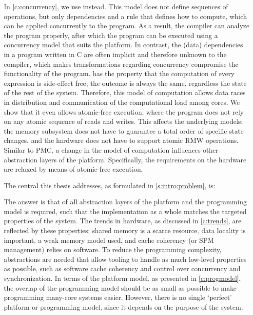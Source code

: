 In \cref{c:concurrency}, we use \lcalc instead.
This model does not define sequences of operations, but only dependencies and a rule that defines how to compute, which can be applied concurrently to the program.
As a result, the compiler can analyze the program properly, after which the program can be executed using a concurrency model that suits the platform.
In contrast, the (data) dependencies in a program written in C are often implicit and therefore unknown to the compiler, which makes transformations regarding concurrency compromise the functionality of the program.
\Lcalc has the property that the computation of every expression is side-effect free; the outcome is always the same, regardless the state of the rest of the system.
Therefore, this model of computation allows data races in distribution and communication of the computational load among cores.
We show that it even allows atomic-free execution, where the program does not rely on any atomic sequence of reads and writes.
This affects the underlying models: the memory subsystem does not have to guarantee a total order of specific state changes, and the hardware does not have to support atomic \acl{RMW} operations.
Similar to \ac{PMC}, a change in the model of computation influences other abstraction layers of the platform.
Specifically, the requirements on the hardware are relaxed by means of atomic-free execution.

The central  this thesis addresses, as formulated in \cref{s:intro:problem}, is:
\begin{emphasize}
\end{emphasize}

The answer is that \codesign* of all abstraction layers of the platform and the programming model is required, such that the implementation as a whole matches the targeted properties of the system.
The trends in hardware, as discussed in \cref{c:trends}, are reflected by these properties: shared memory is a scarce resource, data locality is important, a weak memory model used, and cache coherency (or \acl{SPM} management) relies on software.
To reduce the programming complexity, abstractions are needed that allow tooling to handle as much low-level properties as possible, such as software cache coherency and control over concurrency and synchronization.
In terms of the platform model, as presented in \cref{c:progmodel}, the overlap of the programming model should be as small as possible to make programming many-core systems easier.
However, there is no single `perfect' platform or programming model, since it depends on the purpose of the system.


